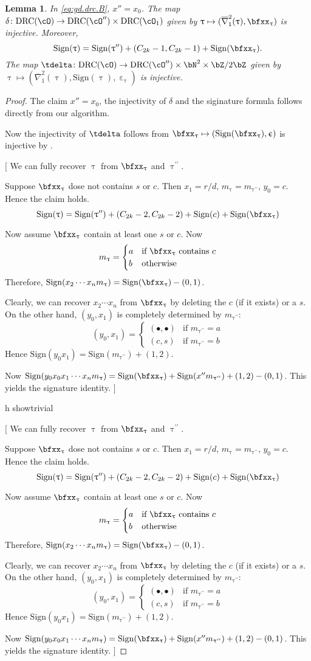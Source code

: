 \documentclass[12pt,a4paper]{amsart}
\newcommand{\trivial}[2][]{\if\relax\detokenize{#1}\relax
  {%
      \color{orange} \vspace{0em} $[$  #2 $]$
      \color{black}
  }
  \else
\ifx#1h
\ifcsname showtrivial\endcsname
{%
    \color{orange} \vspace{0em}  $[$ #2 $]$
    \color{black}
}
\fi
\else {\red Wrong argument!} \fi
\fi
}
\def\eDDo{\overline{\nabla}_1}
\numberwithin{equation}{section}
\newtheorem{lem}[thm]{Lemma}
\theoremstyle{remark}
\def\ssign{\mathrm{Sign}}
\def\drc{\mathrm{DRC}}
\def\cOpp{\cO^{\prime\prime}}
\def\uptaupp{\uptau^{\prime\prime}}
\begin{document}
\begin{lem}\label{lem:gd.inj.M}
  In \eqref{eq:gd.drc.B}, $x''=x_{0}$.
  The map $\delta\colon  \drc(\cO)\rightarrow \drc(\cOpp) \times \drc(\cO_{1})$
  given by $\uptau\mapsto (\eDDo^{2}(\uptau),\bfxx_{\uptau})$ is injective.
  Moreover,
  \[
  \ssign(\uptau) =\ssign(\uptaupp) + (C_{2k}-1, C_{2k}-1)+\ssign(\bfxx_{\uptau}).
  \]
  The map $\tdelta\colon \drc(\cO)\rightarrow \drc(\cOpp) \times \bN^{2}\times \bZ/2\bZ$
  given by $\uptau\mapsto (\eDDo^{2}(\uptau), \ssign(\uptau),\upepsilon_{\uptau})$ is injective.
\end{lem}
\begin{proof}
  The claim $x''=x_{0}$, the injectivity of $\delta$ and the siginature formula follows directly from our algorithm.

  Now the injectivity of $\tdelta$ follows from
  $\bfxx_{\uptau}\mapsto (\ssign(\bfxx_{\uptau}), \upepsilon)$ is injective by
  .
  \trivial{
    We can fully recover $\uptau$ from $\bfxx_{\uptau}$ and $\uptaupp$.

    Suppose $\bfxx_{\uptau}$ dose not contains $s$ or $c$.
    Then $x_{1}=r/d$,  $m_{\uptau}=m_{\uptaupp}$, $y_{0}=c$.
    Hence the claim holds.
    \[
      \ssign(\uptau) =\ssign(\uptaupp) + (C_{2k}-2,C_{2k}-2) + \ssign(c) +\ssign(\bfxx_{\uptau})
    \]

    Now assume $\bfxx_{\uptau}$ contain at least one $s$ or $c$.
    Now
    \[
      m_{\uptau} = \begin{cases}
        a & \text{if $\bfxx_{\uptau}$ contains $c$}\\
        b & \text{otherwise}
      \end{cases}
    \]
    Therefore, $\ssign(x_{2}\cdots x_{n}m_{\uptau}) = \ssign(\bfxx_{\uptau}) - (0,1)$.


    Clearly, we can recover $x_{2}\cdots x_{n}$ from $\bfxx_{\uptau}$ by
    deleting the $c$ (if it exists) or a $s$.
    On the other hand, $(y_{0}, x_{1})$ is completely determined by
    $m_{\uptaupp}$:
    \[
      (y_{0},x_{1}) = \begin{cases}
        (\bullet, \bullet) & \text{if $m_{\uptaupp}=a$}\\
        (c, s) & \text{if $m_{\uptaupp}=b$}
      \end{cases}
    \]
    Hence $\ssign(y_{0}x_{1}) = \ssign(m_{\uptaupp}) + (1,2)$.

    Now
    $\ssign(y_{0}x_{0}x_{1}\cdots x_{n}m_{\uptau})  =  \ssign(\bfxx_{\uptau}) +\ssign(x'' m_{\uptaupp}) + (1,2)-(0,1)$.
    This yields the signature identity.
  }
\end{proof}
\end{document}
